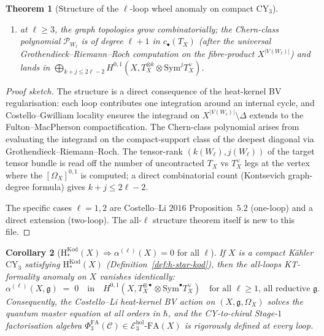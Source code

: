 \documentclass[11pt]{article}
\newtheorem{theorem}{Theorem}[section]
\newtheorem{corollary}[theorem]{Corollary}
\providecommand{\CY}{\mathrm{CY}}
\providecommand{\Om}{\Omega}
\providecommand{\Sym}{\mathrm{Sym}}
\providecommand{\cC}{\mathcal{C}}
\providecommand{\fg}{\mathfrak{g}}
\providecommand{\PhiFA}{\Phi^{\mathrm{FA}}}
\begin{document}
\begin{theorem}[Structure of the $\ell$-loop wheel anomaly on compact $\CY_3$]
\begin{enumerate}[label=\textup{(\arabic*)}]
\begin{itemize}
the correct form uses Todd-class expansion);
\item $D_2$: two circles connected by a tube of length $1$;
$\mathcal P = c_2 \cdot c_2$ identical to spectacles up to symmetry
factor.
\end{itemize}
\item at $\ell \geq 3$, the graph topologies grow combinatorially;
the Chern-class polynomial $\mathcal P_{W_\ell}$ is of degree
$\ell + 1$ in $c_\bullet(T_X)$ (after the universal
Grothendieck--Riemann--Roch computation on the fibre-product
$X^{|V(W_\ell)|}$) and lands in $\bigoplus_{k+j \leq 2\ell - 2}
H^{0,1}(X, T_X^{\otimes k} \otimes \Sym^j T_X^\vee)$.
\end{enumerate}
\end{theorem}

\begin{proof}[Proof sketch]
The structure is a direct consequence of the heat-kernel BV
regularisation: each loop contributes one integration around an
internal cycle, and Costello--Gwilliam locality ensures the
integrand on $X^{|V(W_\ell)|} \setminus \Delta$ extends to the
Fulton--MacPherson compactification.  The Chern-class polynomial
arises from evaluating the integrand on the compact-support
class of the deepest diagonal via Grothendieck--Riemann--Roch.
The tensor-rank $(k(W_\ell), j(W_\ell))$ of the target tensor
bundle is read off the number of uncontracted $T_X$ vs $T_X^\vee$
legs at the vertex where the $[\Om_X]^{0,1}$ is computed;  a direct
combinatorial count (Kontsevich graph-degree formula) gives
$k + j \leq 2\ell - 2$.

The specific cases $\ell = 1, 2$ are Costello--Li $2016$
Proposition~$5.2$ (one-loop) and a direct extension  (two-loop).
The all-$\ell$ structure theorem itself is new to this file.
\end{proof}

\begin{corollary}[$\mathrm{H}_*^{\mathrm{Kod}}(X) \Rightarrow \alpha^{(\ell)}(X) = 0$ for all $\ell$]
\label{cor:h-star-implies-all-loops-vanishing}
\ClaimStatusTheorem
If $X$ is a compact K\"ahler $\CY_3$ satisfying
$\mathrm{H}_*^{\mathrm{Kod}}(X)$
(Definition~\ref{def:h-star-kod}), then the all-loops KT-formality
anomaly on $X$ vanishes identically:
\[
  \alpha^{(\ell)}(X, \fg) \;=\; 0 \quad \text{in}\quad
  H^{0,1}(X, T_X^{\otimes \bullet} \otimes \Sym^\bullet T_X^\vee)
  \quad \text{for all $\ell \geq 1$, all reductive $\fg$.}
\]
Consequently, the Costello--Li heat-kernel BV action on $(X, \fg,
\Om_X)$ solves the quantum master equation at all orders in
$\hbar$, and the CY-to-chiral Stage-$1$ factorisation algebra
$\PhiFA_3(\cC) \in \mathcal E_3^{\mathrm{hol}}\text{-}\mathrm{FA}(X)$
is rigorously defined at every loop.
\end{corollary}
\end{document}
